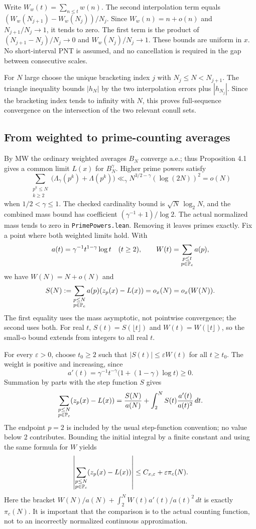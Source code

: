 Write $W_w(t)=\sum_{n\leq t}w(n)$. The second interpolation term equals $(W_w(N_{j+1})-W_w(N_j))/N_j$. Since $W_w(n)=n+o(n)$ and $N_{j+1}/N_j\to1$, it tends to zero. The first term is the product of $(N_{j+1}-N_j)/N_j\to0$ and $W_w(N_j)/N_j\to1$. These bounds are uniform in $x$. No short-interval PNT is assumed, and no cancellation is required in the gap between consecutive scales.

For $N$ large choose the unique bracketing index $j$ with $N_j\leq N<N_{j+1}$. The triangle inequality bounds $|h_N|$ by the two interpolation errors plus $|h_{N_j}|$. Since the bracketing index tends to infinity with $N$, this proves full-sequence convergence on the intersection of the two relevant conull sets.
\fi

\subsection*{From weighted to prime-counting averages}
By MW the ordinary weighted averages $B_N$ converge a.e.; thus Proposition 4.1 gives a common limit $L(x)$ for $B_N^\gamma$. Higher prime powers satisfy
\[
 \sum_{\substack{p^k\leq N\\k\geq2}}
 \bigl(\Lambda_\gamma(p^k)+\Lambda(p^k)\bigr)
 \ll_\gamma N^{3/2-\gamma}(\log(2N))^2=o(N)
\]
when $1/2<\gamma\leq1$. The checked cardinality bound is $\sqrt N\,\log_2N$, and the combined mass bound has coefficient $(\gamma^{-1}+1)/\log2$. The actual normalized mass tends to zero in \texttt{PrimePowers.lean}. Removing it leaves primes exactly.
\ifDetailed
Fix a point where both weighted limits hold. With
\[
 a(t)=\gamma^{-1}t^{1-\gamma}\log t\quad(t\geq2),\qquad
 W(t)=\sum_{\substack{p\leq t\\p\in\mathbb P_c}}a(p),
\]
we have $W(N)=N+o(N)$ and
\[
 S(N):=\sum_{\substack{p\leq N\\p\in\mathbb P_c}}a(p)(z_p(x)-L(x))=o_x(N)=o_x(W(N)).
\]
The first equality uses the mass asymptotic, not pointwise convergence; the second uses both. For real $t$, $S(t)=S(\lfloor t\rfloor)$ and $W(t)=W(\lfloor t\rfloor)$, so the small-o bound extends from integers to all real $t$.

For every $\varepsilon>0$, choose $t_0\geq2$ such that $|S(t)|\leq\varepsilon W(t)$ for all $t\geq t_0$. The weight is positive and increasing, since
\[
 a'(t)=\gamma^{-1}t^{-\gamma}\bigl(1+(1-\gamma)\log t\bigr)\geq0.
\]
Summation by parts with the step function $S$ gives
\[
 \sum_{\substack{p\leq N\\p\in\mathbb P_c}}(z_p(x)-L(x))
 =\frac{S(N)}{a(N)}+\int_2^N S(t)\frac{a'(t)}{a(t)^2}\,dt.
\]
The endpoint $p=2$ is included by the usual step-function convention; no value below $2$ contributes. Bounding the initial integral by a finite constant and using the same formula for $W$ yields
\[
 \left|\sum_{\substack{p\leq N\\p\in\mathbb P_c}}(z_p(x)-L(x))\right|
 \leq C_{x,\varepsilon}+\varepsilon\pi_c(N).
\]
Here the bracket $W(N)/a(N)+\int_2^N W(t)a'(t)/a(t)^2\,dt$ is exactly $\pi_c(N)$. It is important that the comparison is to the actual counting function, not to an incorrectly normalized continuous approximation.

